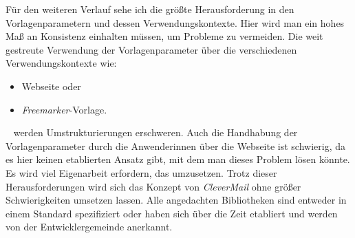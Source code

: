 \newline
\newline
Für den weiteren Verlauf sehe ich die größte Herausforderung in den Vorlagenparametern und dessen Verwendungskontexte. Hier wird man ein hohes Maß an Konsistenz einhalten müssen, um Probleme zu vermeiden. Die weit gestreute Verwendung der Vorlagenparameter über die verschiedenen Verwendungskontexte wie:
\begin{itemize}
	\item Webseite oder
	\item \emph{Freemarker}-Vorlage.
\end{itemize} 
\ \newline
werden Umstrukturierungen erschweren. Auch die Handhabung der Vorlagenparameter durch die Anwenderinnen über die Webseite ist schwierig, da es hier keinen etablierten Ansatz gibt, mit dem man dieses Problem lösen könnte. Es wird viel Eigenarbeit erfordern, das umzusetzen. Trotz dieser Herausforderungen wird sich das Konzept von \emph{CleverMail} ohne größer Schwierigkeiten umsetzen lassen. Alle angedachten Bibliotheken sind entweder in einem Standard spezifiziert oder haben sich über die Zeit etabliert und werden von der Entwicklergemeinde anerkannt.